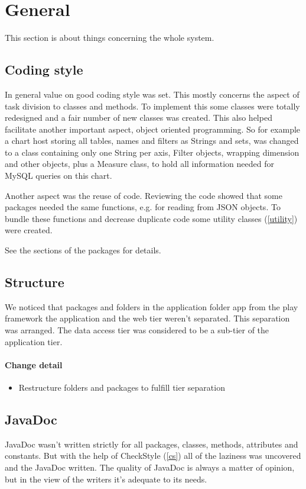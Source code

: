 \section{General}
This section is about things concerning the whole system.

\subsection{Coding style}
In general value on good coding style was set. This mostly concerns the aspect
of task division to classes and methods. To implement this some classes were totally redesigned
and a fair number of new classes was created. This also helped facilitate another important aspect, object oriented programming.
So for example a chart host storing all tables, names and filters as Strings and sets, was changed to
a class containing only one String per axis, Filter objects, wrapping dimension and other objects, plus a Measure
class, to hold all information needed for MySQL queries on this chart.


Another aspect was the reuse of code. Reviewing the code showed that some packages needed the same
functions, e.g. for reading from JSON objects. To bundle these functions and
decrease duplicate code some utility classes (\ref{utility}) were created.

See the sections of the packages for details.

\subsection{Structure}
We noticed that packages and folders in the application folder app
from the play framework the application and the web tier weren't separated. This separation was arranged. 
The data access tier was considered to be a sub-tier of the application tier. 

\paragraph{Change detail}
\begin{itemize}
  \item Restructure folders and packages to fulfill tier separation
\end{itemize}

\subsection{JavaDoc} 
JavaDoc wasn't written strictly for all packages, classes, methods, attributes and constants. 
But with the help of CheckStyle (\ref{cs}) all of the laziness was uncovered and the JavaDoc written.
The quality of JavaDoc is always a matter of opinion, but in the view of the
writers it's adequate to its needs.

